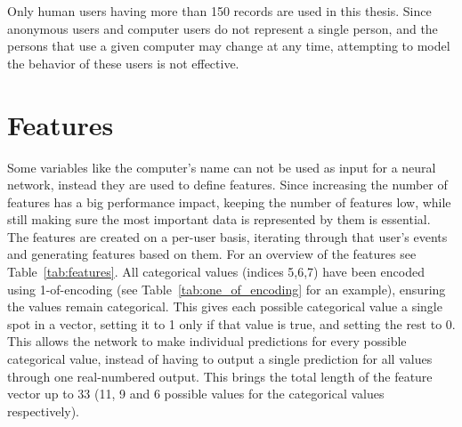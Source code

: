 \begin{table}[htbp]
	\centering
	\caption{The data set structure}\label{tab:data}
\end{table}

Only human users having more than 150 records are used in this thesis. Since anonymous users and computer users do not represent a single person, and the persons that use a given computer may change at any time, attempting to model the behavior of these users is not effective.

\section{Features}
Some variables like the computer's name can not be used as input for a neural network, instead they are used to define features. Since increasing the number of features has a big performance impact, keeping the number of features low, while still making sure the most important data is represented by them is essential. The features are created on a per-user basis, iterating through that user's events and generating features based on them. For an overview of the features see Table~\ref{tab:features}. All categorical values (indices 5,6,7) have been encoded using 1-of-encoding (see Table~\ref{tab:one_of_encoding} for an example), ensuring the values remain categorical. This gives each possible categorical value a single spot in a vector, setting it to 1 only if that value is true, and setting the rest to 0. This allows the network to make individual predictions for every possible categorical value, instead of having to output a single prediction for all values through one real-numbered output. This brings the total length of the feature vector up to 33 (11, 9 and 6 possible values for the categorical values respectively).


